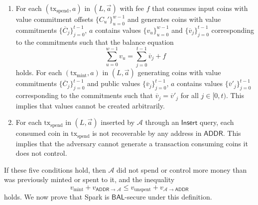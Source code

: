 \documentclass{llncs}
\newcommand{\func}[1]{\mathsf{#1}}
\begin{document}
\begin{enumerate}
    \item\label{cond:balance} For each $(\text{tx}_{\text{spend}}, a)$ in $(L, \vec{a})$ with fee $f$ that consumes input coins with value commitment offsets $\{C_u'\}_{u=0}^{w-1}$ and generates coins with value commitments $\{\overline{C}_j\}_{j=0}^{t-1}$, $a$ contains values $\{v_u\}_{u=0}^{w-1}$ and $\{\overline{v}_j\}_{j=0}^{t-1}$ corresponding to the commitments such that the balance equation
    $$\sum_{u=0}^{w-1} v_u = \sum_{j=0}^{t-1} \overline{v}_j + f$$
    holds.
    For each $(\text{tx}_{\text{mint}}, a)$ in $(L, \vec{a})$ generating coins with value commitments $\{\overline{C}_j\}_{j=0}^{t-1}$ and public values $\{\overline{v}_j\}_{j=0}^{t-1}$, $a$ contains values $\{\overline{v}'_j\}_{j=0}^{t-1}$ corresponding to the commitments such that $\overline{v}_j = \overline{v}'_j$ for all $j \in [0,t)$.
    This implies that values cannot be created arbitrarily.
    
    \item\label{cond:honest} For each $\text{tx}_{\text{spend}}$ in $(L, \vec{a})$ inserted by $\mathcal{A}$ through an $\func{Insert}$ query, each consumed coin in $\text{tx}_{\text{spend}}$ is not recoverable by any address in $\func{ADDR}$.
    This implies that the adversary cannot generate a transaction consuming coins it does not control.
\end{enumerate}
If these five conditions hold, then $\mathcal{A}$ did not spend or control more money than was previously minted or spent to it, and the inequality
$$v_{\text{mint}} + v_{\func{ADDR} \to \mathcal{A}} \leq v_{\text{unspent}} + v_{\mathcal{A} \to \func{ADDR}}$$
holds.
We now prove that Spark is $\func{BAL}$-secure under this definition.
\end{document}
